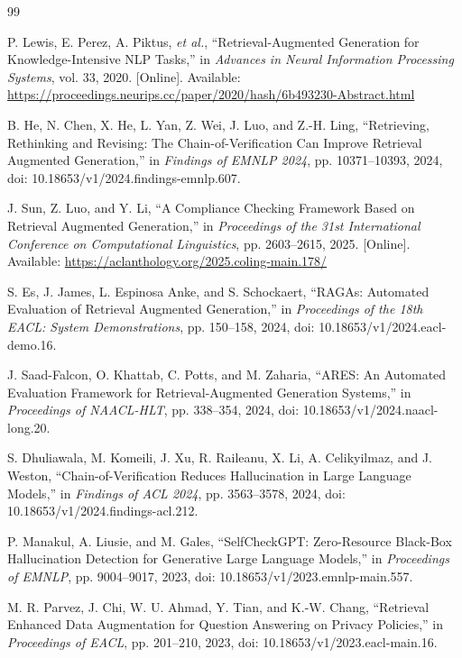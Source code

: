 \documentclass[11pt,journal,onecolumn]{IEEEtran}
\begin{document}
\begin{thebibliography}{99}

P. Lewis, E. Perez, A. Piktus, \textit{et al.}, ``Retrieval-Augmented Generation for Knowledge-Intensive NLP Tasks,'' in \textit{Advances in Neural Information Processing Systems}, vol. 33, 2020. [Online]. Available: \url{https://proceedings.neurips.cc/paper/2020/hash/6b493230-Abstract.html}

B. He, N. Chen, X. He, L. Yan, Z. Wei, J. Luo, and Z.-H. Ling, ``Retrieving, Rethinking and Revising: The Chain-of-Verification Can Improve Retrieval Augmented Generation,'' in \textit{Findings of EMNLP 2024}, pp. 10371--10393, 2024, doi: 10.18653/v1/2024.findings-emnlp.607.

J. Sun, Z. Luo, and Y. Li, ``A Compliance Checking Framework Based on Retrieval Augmented Generation,'' in \textit{Proceedings of the 31st International Conference on Computational Linguistics}, pp. 2603--2615, 2025. [Online]. Available: \url{https://aclanthology.org/2025.coling-main.178/}

S. Es, J. James, L. Espinosa Anke, and S. Schockaert, ``RAGAs: Automated Evaluation of Retrieval Augmented Generation,'' in \textit{Proceedings of the 18th EACL: System Demonstrations}, pp. 150--158, 2024, doi: 10.18653/v1/2024.eacl-demo.16.

J. Saad-Falcon, O. Khattab, C. Potts, and M. Zaharia, ``ARES: An Automated Evaluation Framework for Retrieval-Augmented Generation Systems,'' in \textit{Proceedings of NAACL-HLT}, pp. 338--354, 2024, doi: 10.18653/v1/2024.naacl-long.20.

S. Dhuliawala, M. Komeili, J. Xu, R. Raileanu, X. Li, A. Celikyilmaz, and J. Weston, ``Chain-of-Verification Reduces Hallucination in Large Language Models,'' in \textit{Findings of ACL 2024}, pp. 3563--3578, 2024, doi: 10.18653/v1/2024.findings-acl.212.

P. Manakul, A. Liusie, and M. Gales, ``SelfCheckGPT: Zero-Resource Black-Box Hallucination Detection for Generative Large Language Models,'' in \textit{Proceedings of EMNLP}, pp. 9004--9017, 2023, doi: 10.18653/v1/2023.emnlp-main.557.

M. R. Parvez, J. Chi, W. U. Ahmad, Y. Tian, and K.-W. Chang, ``Retrieval Enhanced Data Augmentation for Question Answering on Privacy Policies,'' in \textit{Proceedings of EACL}, pp. 201--210, 2023, doi: 10.18653/v1/2023.eacl-main.16.


\end{thebibliography}
\end{document}
